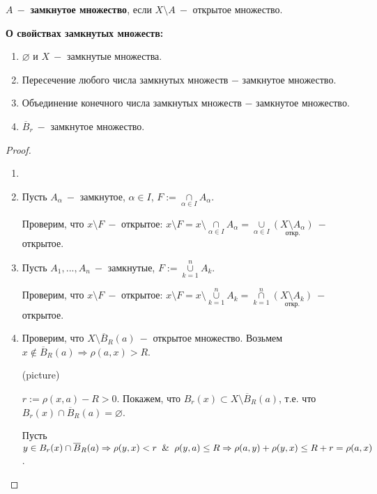 \begin{definition}
    $A\ -$ \textbf{замкнутое множество}, если $X\setminus A\ -$ открытое множество.
\end{definition}

\begin{theorem}
    \textbf{О свойствах замкнутых множеств:}
    \begin{enumerate}
        \item $\varnothing$ и $X\ -$ замкнутые множества.
        \item Пересечение любого числа замкнутых множеств $-$ замкнутое множество.
        \item Объединение конечного числа замкнутых множеств $-$ замкнутое множество.
        \item $\overline{B}_r\ -$ замкнутое множество.
    \end{enumerate}
\end{theorem}

\begin{proof}
    \begin{enumerate}
        \item[]
        \item Пусть $A_\alpha\ -$ замкнутое, $\alpha\in I$, $F:=\cap\limits_{\alpha\in I}A_\alpha$.

        Проверим, что $x\setminus F\ -$ открытое: $x\setminus F=x\setminus \cap\limits_{\alpha\in I}A_\alpha=\cup\limits_{\alpha\in I}\underset{\text{откр.}}{(X\setminus A_\alpha)}\ -$ открытое.
        \item Пусть $A_1,...,A_n\ -$ замкнутые, $F:=\cup\limits_{k=1}^nA_k$.

        Проверим, что $x\setminus F\ -$ открытое: $x\setminus F=x\setminus \cup\limits_{k=1}^nA_k=\cap\limits_{k=1}^n\underset{\text{откр.}}{(X\setminus A_k)}\ -$ открытое.
        \item Проверим, что $X\setminus \overline{B}_R(a)\ -$ открытое множество. Возьмем $x\notin \overline{B}_R(a)\Rightarrow \rho (a,x)>R$.

        (picture)

        $r:=\rho(x,a)-R>0$. Покажем, что $B_r(x)\subset X\setminus \overline{B}_R(a)$, т.е. что $B_r(x)\cap \overline{B}_R(a) =\varnothing$.

        Пусть $y\in B_r(x)\cap \overline{B}_R(a)\Rightarrow \rho(y,x)<r\And\rho(y, a)\leq R\Rightarrow \rho(a,y)+\rho(y,x)\leq R+r=\rho(a,x)$.
    \end{enumerate}
\end{proof}

